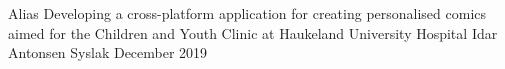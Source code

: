 \documentclass[a4paper, 11pt]{report}
\begin{document}
    \maketitlepage
        {Alias}
        {Developing a cross-platform application for creating personalised comics aimed for the Children and Youth Clinic at Haukeland University Hospital}
        {Idar Antonsen Syslak}
        {December 2019}
    
    
    
    
    
    \tableofcontents
    \listoffigures
    \listoftables
    
    
    
    
    
    
    
    
    
    
    
    \printbibliography
    
    \appendix
    
\end{document}
